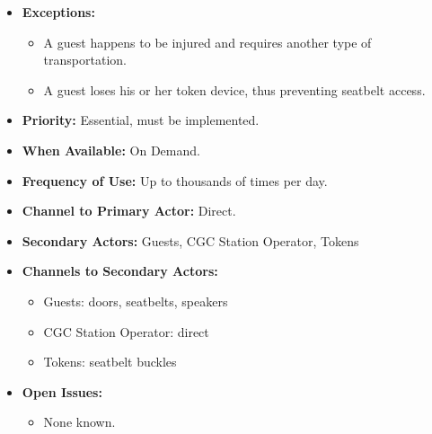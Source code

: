 \documentclass[12pt]{article}
\begin{document}
\begin{itemize}
        \item[]\textbf{Exceptions:}
            \begin{itemize}
                \item[] A guest happens to be injured and requires another type of transportation.
                \item[] A guest loses his or her token device, thus preventing seatbelt access.
            \end{itemize}

        \item[]\textbf{Priority:}
            Essential, must be implemented.

        \item[]\textbf{When Available:}
            On Demand.

        \item[]\textbf{Frequency of Use:}
            Up to thousands of times per day.
            
        \item[]\textbf{Channel to Primary Actor:}
            Direct.

        \item[]\textbf{Secondary Actors:}
            Guests, CGC Station Operator, Tokens
            
        \item[]\textbf{Channels to Secondary Actors:}
            \begin{itemize}
                \item[] Guests: doors, seatbelts, speakers
                \item[] CGC Station Operator: direct
                \item[] Tokens: seatbelt buckles
            \end{itemize}

        \item[]\textbf{Open Issues:}
            \begin{itemize}
                \item[] None known.
            \end{itemize}
    \end{itemize}
    
\end{document}
